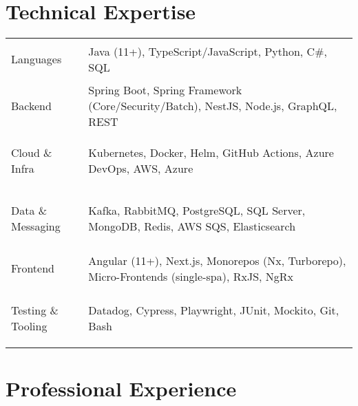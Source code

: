 \section*{Technical Expertise}
{
    \renewcommand{\arraystretch}{\skillsRowHeightScale}
    \begin{tabularx}{\textwidth}
    {@{} >{\bfseries\scshape\raggedright}p{\skillsLabelWidth} @{\hspace{\skillsLabelValueGap}} X @{}}
        Languages & \small Java (11+), TypeScript/JavaScript, Python, C\#, SQL \\
        Backend & \small Spring Boot, Spring Framework (Core/Security/Batch), NestJS, Node.js, GraphQL, REST \\
        Cloud \& Infra & \small Kubernetes, Docker, Helm, GitHub Actions, Azure DevOps, AWS, Azure \\
        Data \& Messaging & \small Kafka, RabbitMQ, PostgreSQL, SQL Server, MongoDB, Redis, AWS SQS, Elasticsearch \\
        Frontend & \small Angular (11+), Next.js, Monorepos (Nx, Turborepo), Micro-Frontends (single-spa), RxJS, NgRx \\
        Testing \& Tooling & \small Datadog, Cypress, Playwright, JUnit, Mockito, Git, Bash \\
    \end{tabularx}
}
\vspace{\skillsTableBottomMargin}

\section*{Professional Experience}

